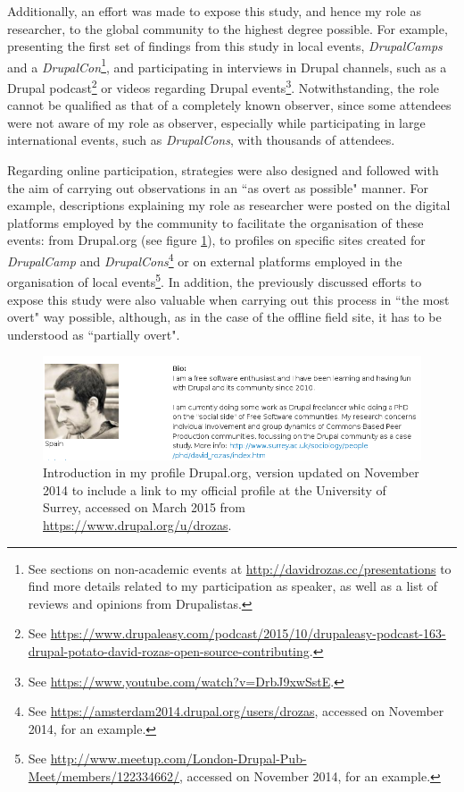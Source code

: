 Additionally, an effort was made to expose this study, and hence my role as researcher, to the global community to the highest degree possible. For example, presenting the first set of findings from this study in local events, \textit{DrupalCamps} and a \textit{DrupalCon}\footnote{See sections on non-academic events at \url{http://davidrozas.cc/presentations} to find more details related to my participation as speaker, as well as a list of reviews and opinions from Drupalistas.}, and participating in interviews in Drupal channels, such as a Drupal podcast\footnote{See \url{https://www.drupaleasy.com/podcast/2015/10/drupaleasy-podcast-163-drupal-potato-david-rozas-open-source-contributing}.} or videos regarding Drupal events\footnote{See \url{https://www.youtube.com/watch?v=DrbJ9xwSstE}.}. Notwithstanding, the role cannot be qualified as that of a completely known observer, since some attendees were not aware of my role as observer, especially while participating in large international events, such as \textit{DrupalCons}, with thousands of attendees. 

Regarding online participation, strategies were also designed and followed with the aim of carrying out observations in an ``as overt as possible" manner. For example, descriptions explaining my role as researcher were posted on the digital platforms employed by the community to facilitate the organisation of these events: from Drupal.org (see figure  \ref{intro_dorg}), to profiles on specific sites created for \textit{DrupalCamp} and \textit{DrupalCons}\footnote{See \url{https://amsterdam2014.drupal.org/users/drozas}, accessed on  November 2014,  for an example.}  or on external platforms employed in the organisation of local events\footnote{See \url{http://www.meetup.com/London-Drupal-Pub-Meet/members/122334662/}, accessed on  November 2014, for an example.}. In addition, the previously discussed efforts to expose this study were also valuable when carrying out this process in ``the most overt" way possible, although, as in the case of the offline field site, it has to be understood as ``partially overt".

\begin{figure}[H]
	\centering
	\includegraphics[scale=0.53]{img/methods/d_org_my_profile.png}
	\caption[Introduction in profile at Drupal.org]%
    {Introduction in my profile Drupal.org, version updated on November 2014 to include a link to my official profile at the University of Surrey, accessed on  March 2015 from \url{https://www.drupal.org/u/drozas}.}
	\label{intro_dorg}
\end{figure}

